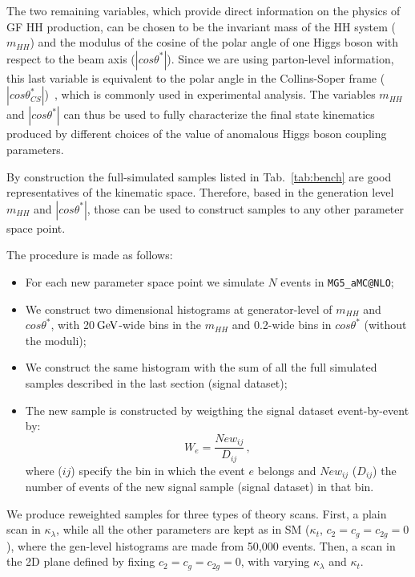 The two remaining variables, which provide direct information on the physics of GF HH production, can be chosen to be the invariant mass of the HH system ($m_{HH}$) and the modulus of the cosine of the  polar angle of one Higgs boson with respect to the beam axis ($|cos\theta^*|$). Since we are using parton-level information, this last variable is equivalent to the polar angle in the Collins-Soper frame ($|cos\theta^*_{CS}|$)~\cite{PhysRevD.16.2219}, which is commonly used in experimental analysis. The variables $m_{HH}$ and $|cos\theta^*|$ can thus be used to fully characterize the final state kinematics produced by different choices of the value of anomalous Higgs boson coupling parameters.

By construction the full-simulated samples listed in Tab.~\ref{tab:bench}  are good representatives of the kinematic space. 
Therefore, based in the generation level $m_{HH}$ and $|cos\theta^*|$, those can be used to construct 
samples to any other parameter space point. 

The procedure is made as follows: 
\begin{itemize}
\item For each new parameter space point we simulate $N$ events in {\tt MG5\_aMC@NLO};
\item We construct two dimensional histograms at generator-level of $m_{HH}$ and $cos\theta^*$, with 20$\,\text{Ge\hspace{-.08em}V}$-wide bins in the $m_{HH}$ and 0.2-wide bins in $cos\theta^*$ (without the moduli);
\item We construct the same histogram with the sum of all the full simulated samples described in the last section (signal dataset);
\item The new sample is constructed by weigthing the signal dataset event-by-event by:
 \begin{equation}
 W_{e} = \frac{New_{ij}}{D_{ij}}\,,
 \end{equation}
 where ($ij$) specify the bin in which the event $e$ belongs and $New_{ij}$ ($D_{ij}$) the number of events of the 
 new signal sample (signal dataset) in that bin. 
 \end{itemize}
 
 We produce reweighted samples for three types of theory scans. 
 First, a plain scan in $\kappa_{\lambda}$, while all the other parameters are kept as in SM ($\kappa_{t}$, $c_2 = c_g  = c_{2g} =0$), where the gen-level histograms are made from 50,000 events. 
 Then, a scan in the 2D plane defined by fixing  $c_2 = c_g  = c_{2g} =0$, with varying $\kappa_{\lambda}$ and $\kappa_{t}$. 

